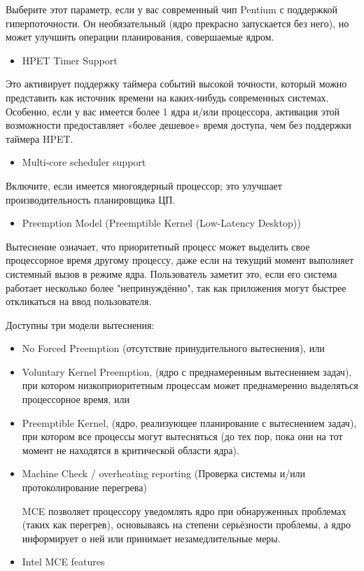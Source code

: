 \documentclass[10pt]{book}
\begin{document}
Выберите этот параметр, если у вас современный чип Pentium с поддержкой гиперпоточности. Он необязательный (ядро прекрасно запускается без него), но может улучшить операции планирования, совершаемые ядром.

\begin{itemize}
\item HPET Timer Support
\end{itemize}

Это активирует поддержку таймера событий высокой точности, который можно представить как источник времени на каких-нибудь современных системах. Особенно, если у вас имеется более 1 ядра и/или процессора, активация этой возможности предоставляет «более дешевое» время доступа, чем без поддержки таймера HPET.

\begin{itemize}
\item Multi-core scheduler support
\end{itemize}

Включите, если имеется многоядерный процессор; это улучшает производительность планировщика ЦП.

\begin{itemize}
\item Preemption Model (Preemptible Kernel (Low-Latency Desktop))
\end{itemize}

Вытеснение означает, что приоритетный процесс может выделить свое процессорное время другому процессу, даже если на текущий момент выполняет системный вызов в режиме ядра. Пользователь заметит это, если его система работает несколько более "непринуждённо", так как приложения могут быстрее откликаться на ввод пользователя.

Доступны три модели вытеснения: 

\begin{itemize}
\item No Forced Preemption (отсутствие принудительного вытеснения), или
\item Voluntary Kernel Preemption, (ядро с преднамеренным вытеснением задач), при котором низкоприоритетным процессам может преднамеренно выделяться процессорное время, или
\item Preemptible Kernel, (ядро, реализующее планирование с вытеснением задач), при котором все процессы могут вытесняться (до тех пор, пока они на тот момент не находятся в критической области ядра).
\item Machine Check / overheating reporting (Проверка системы и/или протоколирование перегрева)

MCE позволяет процессору уведомлять ядро при обнаруженных проблемах (таких как перегрев), основываясь на степени серьёзности проблемы, а ядро информирует о ней или принимает незамедлительные меры.
\item Intel MCE features
\end{itemize}
\end{document}
